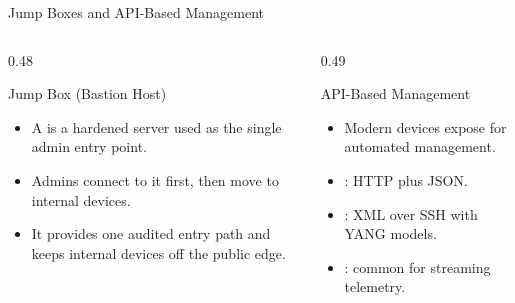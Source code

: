 \documentclass[aspectratio=169]{beamer}  %
\begin{document}
\begin{frame}[t]{Jump Boxes and API-Based Management}
    \begin{columns}[T]
        \begin{column}{0.48\textwidth}
            \begin{block}{Jump Box (Bastion Host)}
                \begin{itemize}
                    \footnotesize
                    \item A  is a hardened server used as the single admin entry point.
                    \item Admins connect to it first, then move to internal devices.
                    \item It provides one audited entry path and keeps internal devices off the public edge.
                \end{itemize}
            \end{block}
        \end{column}
        \begin{column}{0.49\textwidth}
            \begin{block}{API-Based Management}
                \begin{itemize}
                    \footnotesize
                    \item Modern devices expose  for automated management.
                    \item {}: HTTP plus JSON.
                    \item {}: XML over SSH with YANG models.
                    \item {}: common for streaming telemetry.
                \end{itemize}
            \end{block}
        \end{column}
    \end{columns}
\end{frame}
\end{document}
